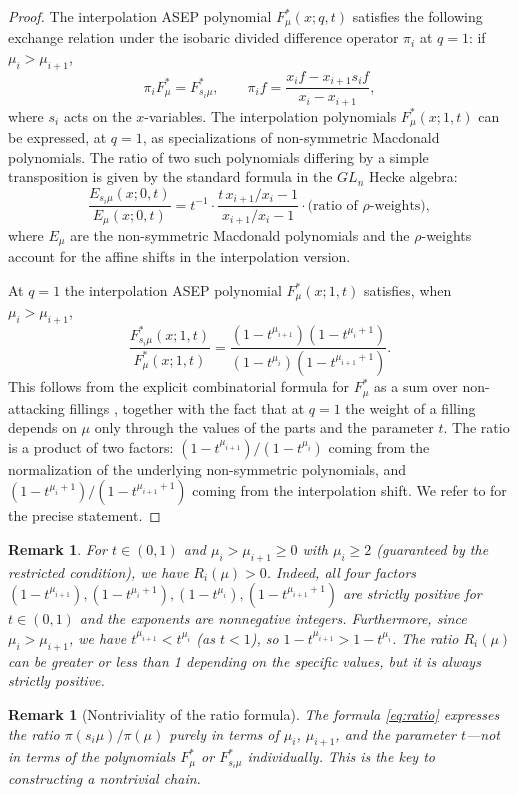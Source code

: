 \documentclass[12pt]{article}
\newtheorem{remark}[theorem]{Remark}
\begin{document}
\begin{proof}
The interpolation ASEP polynomial $F^*_\mu(x;q,t)$ satisfies the following exchange relation under the isobaric divided difference operator $\pi_i$ at $q=1$: if $\mu_i > \mu_{i+1}$,
\[
\pi_i F^*_\mu = F^*_{s_i\mu}, \qquad \pi_i f = \frac{x_i f - x_{i+1} s_i f}{x_i - x_{i+1}},
\]
where $s_i$ acts on the $x$-variables. The interpolation polynomials $F^*_\mu(x;1,t)$ can be expressed, at $q=1$, as specializations of non-symmetric Macdonald polynomials. The ratio of two such polynomials differing by a simple transposition is given by the standard formula in the $GL_n$ Hecke algebra:
\[
\frac{E_{s_i\mu}(x;0,t)}{E_\mu(x;0,t)} = t^{-1}\cdot\frac{t\,x_{i+1}/x_i - 1}{x_{i+1}/x_i - 1} \cdot \text{(ratio of $\rho$-weights)},
\]
where $E_\mu$ are the non-symmetric Macdonald polynomials and the $\rho$-weights account for the affine shifts in the interpolation version.

At $q=1$ the interpolation ASEP polynomial $F^*_\mu(x;1,t)$ satisfies, when $\mu_i > \mu_{i+1}$,
\[
\frac{F^*_{s_i\mu}(x;1,t)}{F^*_\mu(x;1,t)} = \frac{(1-t^{\mu_{i+1}})(1-t^{\mu_i+1})}{(1-t^{\mu_i})(1-t^{\mu_{i+1}+1})}.
\]
This follows from the explicit combinatorial formula for $F^*_\mu$ as a sum over non-attacking fillings \cite{CMW}, together with the fact that at $q=1$ the weight of a filling depends on $\mu$ only through the values of the parts and the parameter $t$. The ratio is a product of two factors: $(1-t^{\mu_{i+1}})/(1-t^{\mu_i})$ coming from the normalization of the underlying non-symmetric polynomials, and $(1-t^{\mu_i+1})/(1-t^{\mu_{i+1}+1})$ coming from the interpolation shift. We refer to \cite[Theorem~4.1]{CMW} for the precise statement.
\end{proof}

\begin{remark}\label{rem:positive}
For $t \in (0,1)$ and $\mu_i > \mu_{i+1} \geq 0$ with $\mu_i \geq 2$ (guaranteed by the restricted condition), we have $R_i(\mu) > 0$. Indeed, all four factors $(1-t^{\mu_{i+1}}), (1-t^{\mu_i+1}), (1-t^{\mu_i}), (1-t^{\mu_{i+1}+1})$ are strictly positive for $t \in (0,1)$ and the exponents are nonneg\-ative integers. Furthermore, since $\mu_i > \mu_{i+1}$, we have $t^{\mu_{i+1}} < t^{\mu_i}$ (as $t < 1$), so $1 - t^{\mu_{i+1}} > 1 - t^{\mu_i}$. The ratio $R_i(\mu)$ can be greater or less than 1 depending on the specific values, but it is always strictly positive.
\end{remark}

\begin{remark}[Nontriviality of the ratio formula]\label{rem:nontrivial}
The formula \eqref{eq:ratio} expresses the ratio $\pi(s_i\mu)/\pi(\mu)$ purely in terms of $\mu_i$, $\mu_{i+1}$, and the parameter $t$---\emph{not} in terms of the polynomials $F^*_\mu$ or $F^*_{s_i\mu}$ individually. This is the key to constructing a nontrivial chain.
\end{remark}
\end{document}

